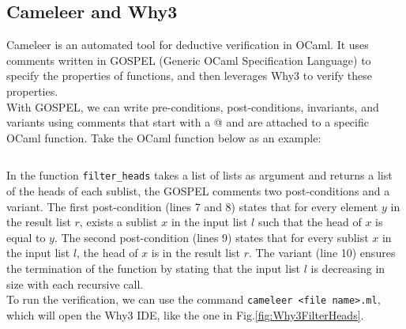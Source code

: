 \documentclass[runningheads]{llncs}
\begin{document}
\subsection{Cameleer and Why3}
Cameleer\autocite{pereiraCameleerDeductiveVerification2021} is an automated tool for deductive verification in OCaml. It uses comments written in GOSPEL\autocite{chargueraudGOSPELProvidingOCaml2019} (Generic OCaml Specification Language) to specify the properties of functions, and then leverages Why3\autocite{filliatreWhy3WherePrograms2013a} to verify these properties.\\
With GOSPEL, we can write pre-conditions, post-conditions, invariants, and variants using comments that start with a @ and are attached to a specific OCaml function. Take the OCaml function below as an example:
\inputminted[fontsize=\small,linenos,xleftmargin=20pt]{ocaml}{../../filter_heads/filter_heads.ml}
In the function \texttt{filter\_heads} takes a list of lists as argument and returns a list of the heads of each sublist, the GOSPEL comments two post-conditions and a variant.
The first post-condition (lines 7 and 8) states that for every element \( y \) in the result list \( r \), exists a sublist \( x \) in the input list \( l \) such that the head of \( x \) is equal to \( y \).
The second post-condition (lines 9) states that for every sublist \( x \) in the input list \( l \), the head of \( x \) is in the result list \( r \).
The variant (line 10) ensures the termination of the function by stating that the input list \( l \) is decreasing in size with each recursive call.\\
To run the verification, we can use the command \texttt{cameleer <file name>.ml}, which will open the Why3 IDE, like the one in Fig.\ref{fig:Why3FilterHeads}.
\end{document}
